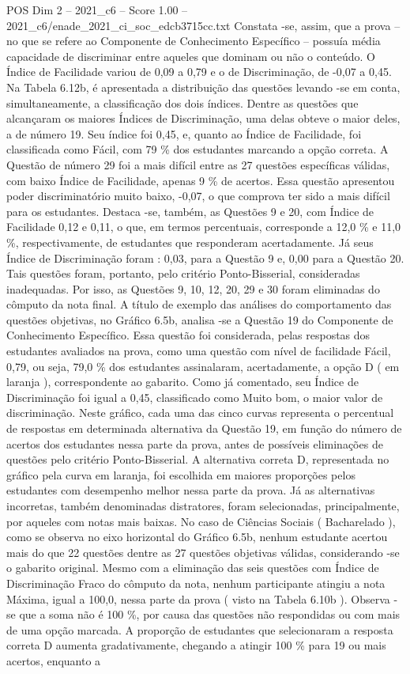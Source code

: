 \begin{textsample}{POS Dim 2 – 2021\_c6 – Score 1.00 – 2021\_c6/enade\_2021\_ci\_soc\_edcb3715cc.txt}
Constata -se, assim, que a prova – no que se refere ao Componente de Conhecimento Específico – possuía média capacidade de discriminar entre aqueles que dominam ou não o conteúdo.
O Índice de Facilidade variou de 0,09 a 0,79 e o de Discriminação, de -0,07 a 0,45.
Na Tabela 6.12b, é apresentada a distribuição das questões levando -se em conta, simultaneamente, a classificação dos dois índices.
Dentre as questões que alcançaram os maiores Índices de Discriminação, uma delas obteve o maior deles, a de número 19.
Seu índice foi 0,45, e, quanto ao Índice de Facilidade, foi classificada como Fácil, com 79 \% dos estudantes marcando a opção correta.
A Questão de número 29 foi a mais difícil entre as 27 questões específicas válidas, com baixo Índice de Facilidade, apenas 9 \% de acertos.
Essa questão apresentou poder discriminatório muito baixo, -0,07, o que comprova ter sido a mais difícil para os estudantes.
Destaca -se, também, as Questões 9 e 20, com Índice de Facilidade 0,12 e 0,11, o que, em termos percentuais, corresponde a 12,0 \% e 11,0 \%, respectivamente, de estudantes que responderam acertadamente.
Já seus Índice de Discriminação foram : 0,03, para a Questão 9 e, 0,00 para a Questão 20.
Tais questões foram, portanto, pelo critério Ponto-Bisserial, consideradas inadequadas.
Por isso, as Questões 9, 10, 12, 20, 29 e 30 foram eliminadas do cômputo da nota final.
A título de exemplo das análises do comportamento das questões objetivas, no Gráfico 6.5b, analisa -se a Questão 19 do Componente de Conhecimento Específico.
Essa questão foi considerada, pelas respostas dos estudantes avaliados na prova, como uma questão com nível de facilidade Fácil, 0,79, ou seja, 79,0 \% dos estudantes assinalaram, acertadamente, a opção D ( em laranja ), correspondente ao gabarito.
Como já comentado, seu Índice de Discriminação foi igual a 0,45, classificado como Muito bom, o maior valor de discriminação.
Neste gráfico, cada uma das cinco curvas representa o percentual de respostas em determinada alternativa da Questão 19, em função do número de acertos dos estudantes nessa parte da prova, antes de possíveis eliminações de questões pelo critério Ponto-Bisserial.
A alternativa correta D, representada no gráfico pela curva em laranja, foi escolhida em maiores proporções pelos estudantes com desempenho melhor nessa parte da prova.
Já as alternativas incorretas, também denominadas distratores, foram selecionadas, principalmente, por aqueles com notas mais baixas.
No caso de Ciências Sociais ( Bacharelado ), como se observa no eixo horizontal do Gráfico 6.5b, nenhum estudante acertou mais do que 22 questões dentre as 27 questões objetivas válidas, considerando -se o gabarito original.
Mesmo com a eliminação das seis questões com Índice de Discriminação Fraco do cômputo da nota, nenhum participante atingiu a nota Máxima, igual a 100,0, nessa parte da prova ( visto na Tabela 6.10b ).
Observa -se que a soma não é 100 \%, por causa das questões não respondidas ou com mais de uma opção marcada.
A proporção de estudantes que selecionaram a resposta correta D aumenta gradativamente, chegando a atingir 100 \% para 19 ou mais acertos, enquanto a

\end{textsample}
